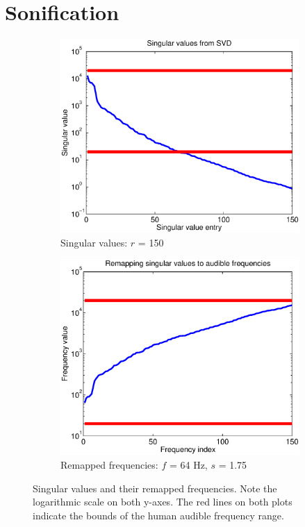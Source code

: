 \documentclass[11pt]{article}
\begin{document}
\section*{Sonification}

\begin{figure}
	\begin{subfigure}[h]{0.5\textwidth}
		\includegraphics[width=\textwidth]{figures/singulars.eps}
		\caption{Singular values: $r$ = 150} 
		\label{fig:singulars}
	\end{subfigure}
	\begin{subfigure}[h]{0.5\textwidth}
		\includegraphics[width=\textwidth]{figures/remap_freqs.eps}
		\caption{Remapped frequencies: $f$ = 64 Hz, $s$ = 1.75}
		\label{fig:freqs}
	\end{subfigure}
	\caption{Singular values and their remapped frequencies. Note the logarithmic scale on both y-axes. The red lines on both plots indicate the bounds of the human audible frequency range.}
\end{figure}
\end{document}

